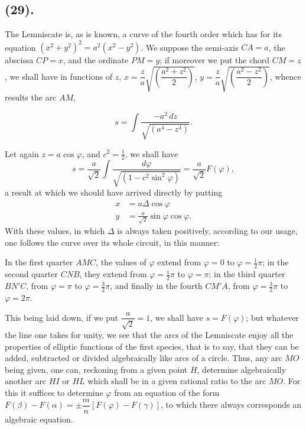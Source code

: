 \documentclass{article}
\begin{document}
\subsection*{(29).}


The Lemniscate is, as is known, a curve of the fourth order which has for its equation $(x^{2}+y^{2})^{2}=a^{2}(x^{2}-y^{2})$. We suppose the semi-axis $CA=a$, the abscissa $CP=x$, and the ordinate $PM=y$; if moreover we put the chord $CM=z$, we shall have in functions of $z$, $x=\dfrac{z}{a}\sqrt{\left(\dfrac{a^{2}+z^{2}}{2}\right)}$, $y=\dfrac{z}{a}\sqrt{\left(\dfrac{a^{2}-z^{2}}{2}\right)}$, whence results the arc $AM$,

\[ s=\int\frac{-a^{2}\,dz}{\sqrt{(a^{4}-z^{4})}}. \]

Let again $z=a\cos\varphi$, and $c^{2}=\frac{1}{2}$, we shall have
\[ s=\frac{a}{\sqrt{2}}\int\frac{d\varphi}{\sqrt{(1-c^{2}\sin^{2}\varphi)}}=\frac{a}{\sqrt{2}}F(\varphi), \]
a result at which we should have arrived directly by putting
\[ \begin{aligned} x &= a\Delta\cos\varphi \\ y &= \frac{a}{\sqrt{2}}\sin\varphi\cos\varphi. \end{aligned} \]
With these values, in which $\Delta$ is always taken positively, according to our usage, one follows the curve over its whole circuit, in this manner:

In the first quarter $AMC$, the values of $\varphi$ extend from $\varphi=0$ to $\varphi=\frac{1}{2}\pi$; in the second quarter $CNB$, they extend from $\varphi=\frac{1}{2}\pi$ to $\varphi=\pi$; in the third quarter $BN'C$, from $\varphi=\pi$ to $\varphi=\frac{3}{2}\pi$, and finally in the fourth $CM'A$, from $\varphi=\frac{3}{2}\pi$ to $\varphi=2\pi$.

This being laid down, if we put $\dfrac{a}{\sqrt{2}}=1$, we shall have $s=F(\varphi)$; but whatever the line one takes for unity, we see that the arcs of the Lemniscate enjoy all the properties of elliptic functions of the first species, that is to say, that they can be added, subtracted or divided algebraically like arcs of a circle. Thus, any arc $MO$ being given, one can, reckoning from a given point $H$, determine algebraically another arc $HI$ or $HL$ which shall be in a given rational ratio to the arc $MO$. For this it suffices to determine $\varphi$ from an equation of the form $F(\beta)-F(\alpha)=\pm\dfrac{m}{n}[F(\varphi)-F(\gamma)]$, to which there always corresponds an algebraic equation.
\end{document}
